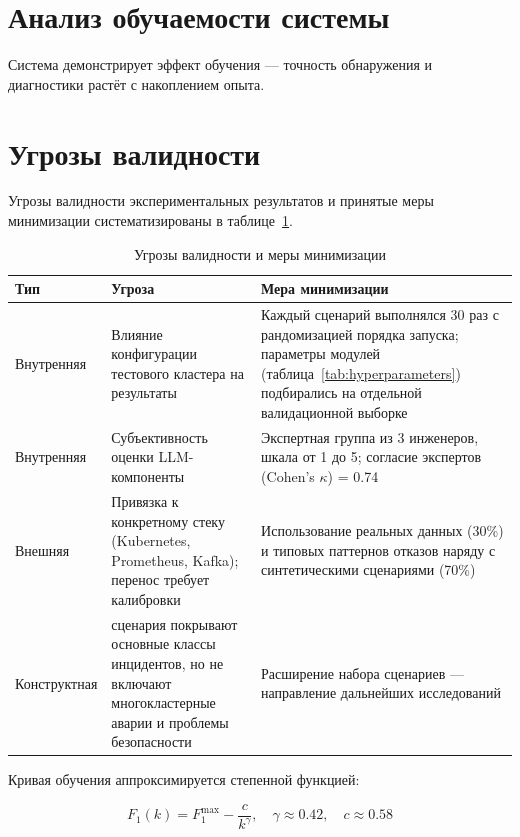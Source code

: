 \section{Анализ обучаемости системы}

Система демонстрирует эффект обучения --- точность обнаружения и диагностики растёт с накоплением опыта.

\section{Угрозы валидности}

Угрозы валидности экспериментальных результатов и принятые меры минимизации систематизированы в таблице~\ref{tab:threats_validity}.

\begin{table}[H]
\centering
\small

\caption{Угрозы валидности и меры минимизации}
\label{tab:threats_validity}
\begin{tabular}{|>{\raggedright\arraybackslash}p{2.5cm}|>{\raggedright\arraybackslash}p{5.5cm}|>{\raggedright\arraybackslash}p{5.5cm}|}
\hline
\textbf{Тип} & \textbf{Угроза} & \textbf{Мера минимизации} \\
\hline
Внутренняя & Влияние конфигурации тестового кластера на результаты & Каждый сценарий выполнялся 30 раз с рандомизацией порядка запуска; параметры модулей (таблица~\ref{tab:hyperparameters}) подбирались на отдельной валидационной выборке \\
\hline
Внутренняя & Субъективность оценки LLM-компоненты & Экспертная группа из 3 инженеров, шкала от 1 до 5; согласие экспертов (Cohen's $\kappa$) = 0.74 \\
\hline
Внешняя & Привязка к конкретному стеку (Kubernetes, Prometheus, Kafka); перенос требует калибровки & Использование реальных данных (30\%) и типовых паттернов отказов \cite{netflix_chaos,aiops_survey} наряду с синтетическими сценариями (70\%) \\
\hline
Конструктная & 4 сценария покрывают основные классы инцидентов, но не включают многокластерные аварии и проблемы безопасности & Расширение набора сценариев --- направление дальнейших исследований \\
\hline
\end{tabular}
\end{table}
Кривая обучения аппроксимируется степенной функцией:

\begin{equation}
F_1(k) = F_1^{\max} - \frac{c}{k^\gamma}, \quad \gamma \approx 0.42, \quad c \approx 0.58
\label{eq:learning_curve}
\end{equation}

